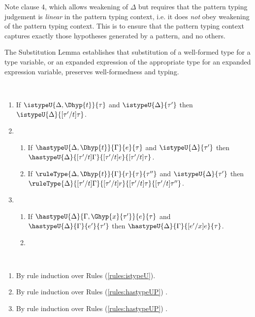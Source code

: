 \begin{grayparbox}
Note clause 4, which allows weakening of $\Delta$ but requires that the {pattern typing judgement} is \emph{linear} in the pattern typing context, i.e. it does \emph{not} obey weakening of the pattern typing context. This is to ensure that the pattern typing context captures exactly those hypotheses generated by a pattern, and no others.
\end{grayparbox}

The Substitution Lemma establishes that substitution of a well-formed type for a type variable, or an expanded expression of the appropriate type for an expanded expression variable, preserves well-formedness and typing.
\begin{lemma}[Substitution]\label{lemma:substitution-UP} ~
\begin{enumerate}
\item If $\istypeU{\Delta, \Dhyp{t}}{\tau}$ and $\istypeU{\Delta}{\tau'}$ then $\istypeU{\Delta}{[\tau'/t]\tau}$.
\item \begin{enumerate}
  \item If $\hastypeU{\Delta, \Dhyp{t}}{\Gamma}{e}{\tau}$ and $\istypeU{\Delta}{\tau'}$ then $\hastypeU{\Delta}{[\tau'/t]\Gamma}{[\tau'/t]e}{[\tau'/t]\tau}$.
  \item \begin{grayparbox} 
  {If} $\ruleType{\Delta, \Dhyp{t}}{\Gamma}{r}{\tau}{\tau''}$ and $\istypeU{\Delta}{\tau'}$ then $\ruleType{\Delta}{[\tau'/t]\Gamma}{[\tau'/t]r}{[\tau'/t]\tau}{[\tau'/t]\tau''}$.
  \end{grayparbox}
  \end{enumerate}
\item \begin{enumerate}
  \item If $\hastypeU{\Delta}{\Gamma, \Ghyp{x}{\tau'}}{e}{\tau}$ and $\hastypeU{\Delta}{\Gamma}{e'}{\tau'}$ then $\hastypeU{\Delta}{\Gamma}{[e'/x]e}{\tau}$.
  \item {}
  \end{enumerate}
\end{enumerate}\end{lemma}
\begin{proof-sketch} ~
\begin{enumerate}
\item By rule induction over Rules (\ref{rules:istypeU}).
\item By  rule induction over Rules (\ref{rules:hastypeUP}) .
\item By  rule induction over Rules (\ref{rules:hastypeUP}) .
\end{enumerate}
\end{proof-sketch}

